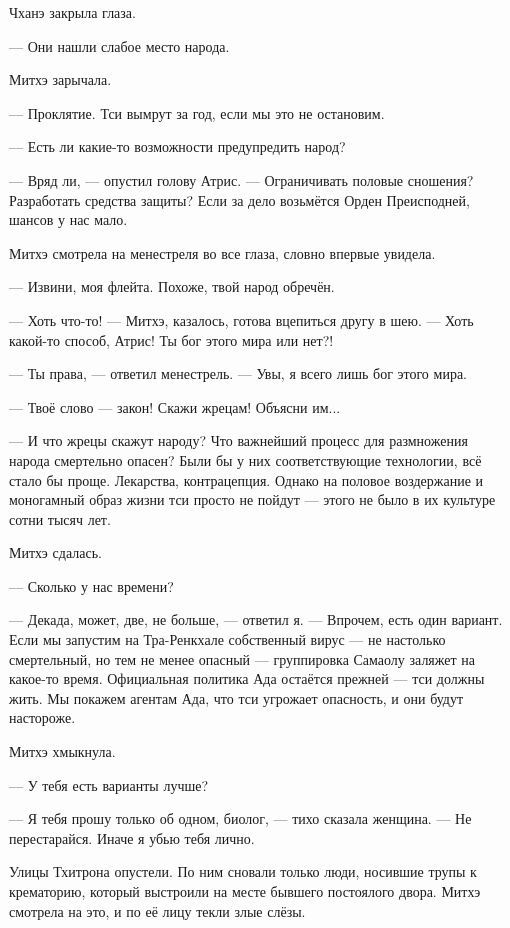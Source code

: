 Чханэ закрыла глаза.

--- Они нашли слабое место народа.

Митхэ зарычала.

--- Проклятие.
Тси вымрут за год, если мы это не остановим.

--- Есть ли какие-то возможности предупредить народ?

--- Вряд ли, --- опустил голову Атрис.
--- Ограничивать половые сношения?
Разработать средства защиты?
Если за дело возьмётся Орден Преисподней, шансов у нас мало.

Митхэ смотрела на менестреля во все глаза, словно впервые увидела.

--- Извини, моя флейта.
Похоже, твой народ обречён.

--- Хоть что-то! --- Митхэ, казалось, готова вцепиться другу в шею.
--- Хоть какой-то способ, Атрис!
Ты бог этого мира или нет?!

--- Ты права, --- ответил менестрель.
--- Увы, я всего лишь бог этого мира.

--- Твоё слово --- закон!
Скажи жрецам!
Объясни им...

--- И что жрецы скажут народу?
Что важнейший процесс для размножения народа смертельно опасен?
Были бы у них соответствующие технологии, всё стало бы проще.
Лекарства, контрацепция.
Однако на половое воздержание и моногамный образ жизни тси просто не пойдут --- этого не было в их культуре сотни тысяч лет.

Митхэ сдалась.

--- Сколько у нас времени?

--- Декада, может, две, не больше, --- ответил я.
--- Впрочем, есть один вариант.
Если мы запустим на Тра-Ренкхале собственный вирус --- не настолько смертельный, но тем не менее опасный --- группировка Самаолу заляжет на какое-то время.
Официальная политика Ада остаётся прежней --- тси должны жить.
Мы покажем агентам Ада, что тси угрожает опасность, и они будут настороже.

Митхэ хмыкнула.

--- У тебя есть варианты лучше?

--- Я тебя прошу только об одном, биолог, --- тихо сказала женщина.
--- Не перестарайся.
Иначе я убью тебя лично.

\asterism

Улицы Тхитрона опустели.
По ним сновали только люди, носившие трупы к крематорию, который выстроили на месте бывшего постоялого двора.
Митхэ смотрела на это, и по её лицу текли злые слёзы.

